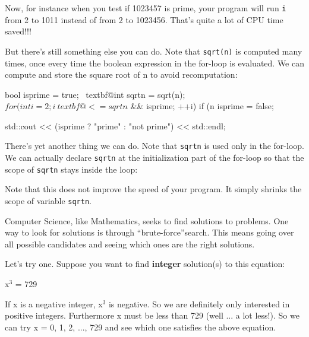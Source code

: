 \begin{console}
Now, for instance when you test if 1023457 is prime, your program will
run \texttt{i} from 2 to 1011 instead of from 2 to 1023456.
That's quite a lot of CPU time saved!!!

But there's still something else you can do. Note that
\texttt{sqrt(n)} is computed many times, once every time the boolean
expression in the for-loop is evaluated. We can compute and store the
square root of n to avoid recomputation:
\begin{console}[commandchars=\~\@\$]
bool isprime = true;
~textbf@int sqrtn = sqrt(n);$
for (int i = 2; i ~textbf@<= sqrtn$ && isprime; ++i)
{   
    if (n %
    {
        isprime = false;
    }
}

std::cout << (isprime ? "prime" : "not prime")
          << std::endl;
\end{console}
There's yet another thing we can do. Note that \texttt{sqrtn} is used only in the for-loop. We can actually declare \texttt{sqrtn} at the initialization part of the for-loop so that the scope of \texttt{sqrtn} stays inside the loop:
Note that this does not improve the speed of your program. It simply
shrinks the scope of variable \texttt{sqrtn}.


\newpage{}

Computer Science, like Mathematics, seeks to find solutions to problems.
One way to look for solutions is through ``brute-force''search. This
means going over all possible candidates and seeing which ones are the
right solutions.

Let's try one. Suppose you want to find \textbf{integer} solution(s) to this equation:
\begin{center}
x$^{3}$ = 729
\end{center}
If x is a negative integer, x$^{3}$ is negative. So we are definitely only interested in positive integers. Furthermore x must be less than 729 (well ... a lot less!). So we can try x = 0, 1, 2, ..., 729 and see which one satisfies the above equation.


\end{console}
